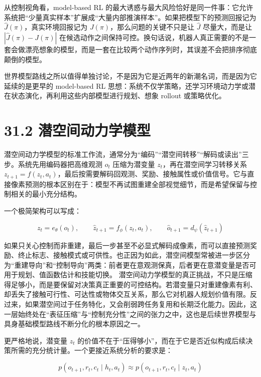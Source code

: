 从控制视角看，model-based RL 的最大诱惑与最大风险恰好是同一件事：它允许系统把“少量真实样本”扩展成“大量内部推演样本”。如果把模型下的预测回报记为 \(\hat{J}(\pi)\)，真实环境回报记为 \(J(\pi)\)，那么问题的关键不只是让 \(\hat{J}\) 尽量大，而是让 \(|\hat{J}(\pi)-J(\pi)|\) 在候选动作之间保持可控。换句话说，机器人真正需要的不是一套会做漂亮想象的模型，而是一套在比较两个动作序列时，其误差不会把排序彻底颠倒的模型。

世界模型路线之所以值得单独讨论，不是因为它是近两年的新潮名词，而是因为它延续的是更早的 model-based RL 思想：系统不仅学策略，还学习环境动力学或潜在状态演化，再利用这些内部模型进行规划、想象 rollout 或策略优化。

\section*{31.2 潜空间动力学模型}


潜空间动力学模型的标准工作流，通常分为“编码”“潜空间转移”“解码或读出”三步。系统先用编码器把高维观测 \(o_t\) 压缩为潜变量 \(z_t\)，再在潜空间学习转移关系 \(z_{t+1}=f(z_t,a_t)\)，最后按需要解码回观测、奖励、接触属性或价值信号。它与直接像素预测的根本区别在于：模型不再试图重建全部视觉细节，而是希望保留与控制相关的最小充分结构。

一个极简架构可以写成：

\begingroup
\scriptsize
\begin{equation*}
z_t = e_\theta(o_t), \qquad \hat{z}_{t+1} = f_\phi(z_t, a_t), \qquad \hat{o}_{t+1} = d_\psi(\hat{z}_{t+1})
\end{equation*}
\endgroup

如果只关心控制而非重建，最后一步甚至不必显式解码成像素，而可以直接预测奖励、终止标志、接触模式或可供性。也正因为如此，潜空间模型常被进一步区分为“重建导向”和“控制导向”两类：前者更在意观测保真，后者更在意潜变量是否可用于规划、值函数估计和技能切换。 潜空间动力学模型的真正挑战，不只是压缩得足够小，而是要保留对决策真正重要的可控结构。若潜变量只对重建像素有利、却丢失了接触可行性、可达性或物体交互关系，那么它对机器人规划价值有限。反过来，如果潜空间过于任务特化，又会削弱跨任务复用和长期泛化能力。因此，这一层始终处在“表征压缩”与“控制充分性”之间的张力之中，这也是后续世界模型与具身基础模型路线不断分化的根本原因之一。

更严格地说，潜变量 \(z_t\) 的价值不在于“压得够小”，而在于它是否近似构成后续决策所需的充分统计量。一个更接近系统分析的要求是：

\begingroup
\footnotesize
\begin{equation*}
p(o_{t+1}, r_t, c_t \mid h_t, a_t) \approx p(o_{t+1}, r_t, c_t \mid z_t, a_t)
\end{equation*}
\endgroup

